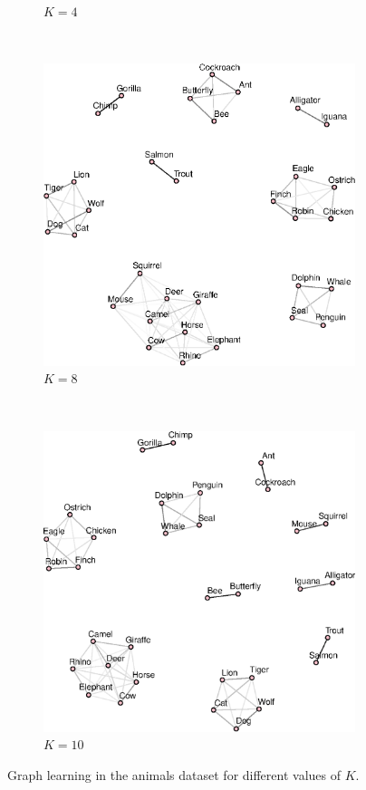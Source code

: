 \documentclass{article}
\begin{document}
\begin{figure}[!htb]
\begin{subfigure}[b]{0.35\textwidth}
        \caption{$K = 4$}
    \end{subfigure}
    ~
    \begin{subfigure}[b]{0.35\textwidth}
        \includegraphics[width=\textwidth]{animals_graph_k8.eps}
        \caption{$K = 8$}
    \end{subfigure}
    ~
    \begin{subfigure}[b]{0.35\textwidth}
        \includegraphics[width=\textwidth]{animals_graph_k10.eps}
        \caption{$K = 10$}
    \end{subfigure}
    \caption{Graph learning in the animals dataset for different values of $K$.}
    \label{fig:performance}
\end{figure}
\end{document}
